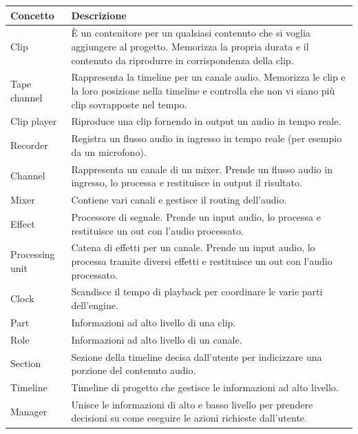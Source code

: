 \documentclass[a4paper,12pt]{report}
\begin{document}
\begin{center}
\begin{longtable}{| m{7em} | m{7cm} |} 
 \hline
 Concetto & Descrizione \\ [0.5ex] 
 \hline
 Clip & È un contenitore per un qualsiasi contenuto che si voglia aggiungere al progetto. Memorizza la propria durata e il contenuto da riprodurre in corrispondenza della clip. \\ 
 \hline
 Tape channel & Rappresenta la timeline per un canale audio. Memorizza le clip e la loro posizione nella timeline e controlla che non vi siano più clip sovrapposte nel tempo. \\
 \hline
 Clip player & Riproduce una clip fornendo in output un audio in tempo reale. \\
 \hline
 Recorder & Registra un flusso audio in ingresso in tempo reale (per esempio da un microfono). \\
 \hline
 Channel & Rappresenta un canale di un mixer.
Prende un flusso audio in ingresso, lo processa e restituisce in output il risultato. \\ 
 \hline
 Mixer & Contiene vari canali e gestisce il routing dell’audio. \\
 \hline 
 Effect & Processore di segnale. Prende un input audio, lo processa e restituisce un out con l’audio processato. \\
 \hline
 Processing unit & Catena di effetti per un canale. Prende un input audio, lo processa tramite diversi effetti e restituisce un out con l’audio processato. \\
 \hline
 Clock & Scandisce il tempo di playback per coordinare le varie parti dell’engine. \\
 \hline
 Part & Informazioni ad alto livello di una clip. \\
 \hline
 Role & Informazioni ad alto livello di un canale. \\
\hline
Section & Sezione della timeline decisa dall’utente per indicizzare una porzione del contenuto audio. \\
\hline
Timeline & Timeline di progetto che gestisce le informazioni ad alto livello. \\
\hline
Manager & Unisce le informazioni di alto e basso livello per prendere decisioni su come eseguire le azioni richieste dall’utente. \\
\hline
\end{longtable}
\end{center}
\end{document}
